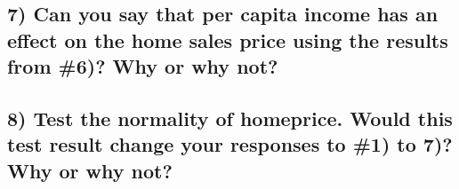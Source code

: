 \documentclass[
  12pt,
]{article}
\begin{document}
\hypertarget{can-you-say-that-per-capita-income-has-an-effect-on-the-home-sales-price-using-the-results-from-6-why-or-why-not}{%
\subsection{7) Can you say that per capita income has an effect on the
home sales price using the results from \#6)? Why or why
not?}\label{can-you-say-that-per-capita-income-has-an-effect-on-the-home-sales-price-using-the-results-from-6-why-or-why-not}}

\hypertarget{test-the-normality-of-homeprice.-would-this-test-result-change-your-responses-to-1-to-7-why-or-why-not}{%
\subsection{8) Test the normality of homeprice. Would this test result
change your responses to \#1) to 7)? Why or why
not?}\label{test-the-normality-of-homeprice.-would-this-test-result-change-your-responses-to-1-to-7-why-or-why-not}}
\end{document}
